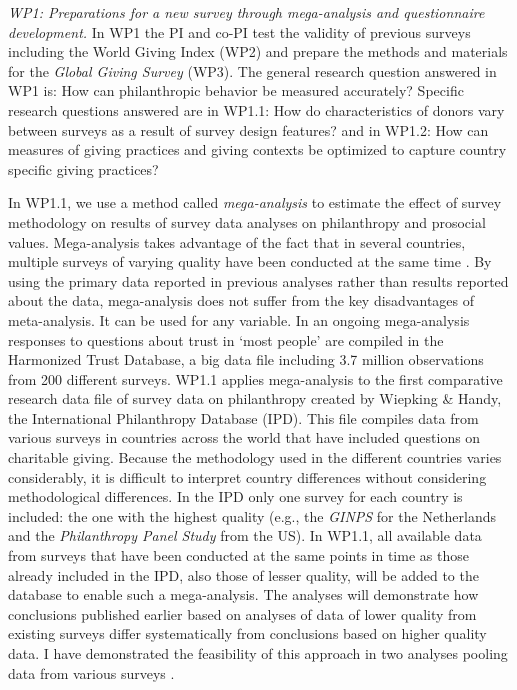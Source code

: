 \documentclass[twocolumn, serif, rga, numeric]{jote-article}
\begin{document}
\emph{WP1: Preparations for a new survey through mega-analysis and questionnaire development.} In WP1 the PI and co-PI test the validity of previous surveys including the World Giving Index (WP2) and prepare the methods and materials for the \emph{Global Giving Survey} (WP3). The general research question answered in WP1 is: How can philanthropic behavior be measured accurately? Specific research questions answered are in WP1.1: How do characteristics of donors vary between surveys as a result of survey design features? and in WP1.2: How can measures of giving practices and giving contexts be optimized to capture country specific giving practices?

In WP1.1, we use a method called \emph{mega-analysis} to estimate the effect of survey methodology on results of survey data analyses on philanthropy and prosocial values. Mega-analysis takes advantage of the fact that in several countries, multiple surveys of varying quality have been conducted at the same time \cite{Bekkers2016d}. By using the primary data reported in previous analyses rather than results reported about the data, mega-analysis does not suffer from the key disadvantages of meta-analysis. It can be used for any variable. In an ongoing mega-analysis responses to questions about trust in `most people' are compiled in the Harmonized Trust Database, a big data file including 3.7 million observations from 200 different surveys. WP1.1 applies mega-analysis to the first comparative research data file of survey data on philanthropy created by Wiepking \& Handy, the International Philanthropy Database (IPD)\cite{Wiepking2015, Wiepking2015a}. This file compiles data from various surveys in countries across the world that have included questions on charitable giving. Because the methodology used in the different countries varies considerably, it is difficult to interpret country differences without considering methodological differences. In the IPD only one survey for each country is included: the one with the highest quality (e.g., the \emph{GINPS} for the Netherlands and the \emph{Philanthropy Panel Study} from the US)\cite{Wilhelm2006}. In WP1.1, all available data from surveys that have been conducted at the same points in time as those already included in the IPD, also those of lesser quality, will be added to the database to enable such a mega-analysis. The analyses will demonstrate how conclusions published earlier based on analyses of data of lower quality from existing surveys differ systematically from conclusions based on higher quality data. I have demonstrated the feasibility of this approach in two analyses pooling data from various surveys \cite{Bekkers2016, Bekkers2006a}.
\end{document}
